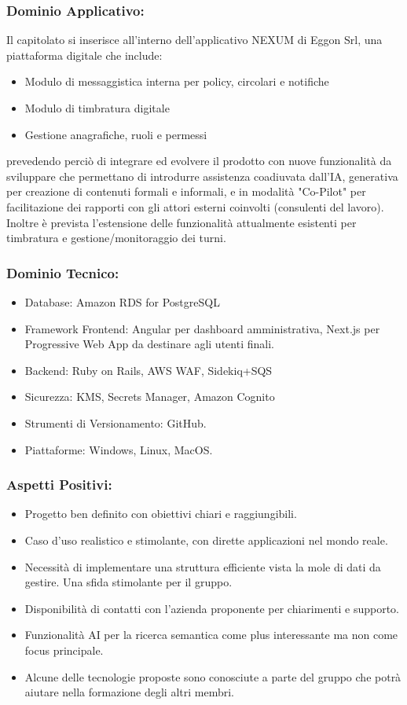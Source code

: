 \documentclass[a4paper,12pt]{article}
\begin{document}
\subsubsection*{Dominio Applicativo:}
Il capitolato si inserisce all'interno dell'applicativo NEXUM di Eggon Srl, una piattaforma digitale che include:
\begin{itemize}
    \item Modulo di messaggistica interna per policy, circolari e notifiche
    \item Modulo di timbratura digitale
    \item Gestione anagrafiche, ruoli e permessi
\end{itemize}
prevedendo perciò di integrare ed evolvere il prodotto con nuove funzionalità da sviluppare che permettano di introdurre assistenza coadiuvata dall'IA, generativa per creazione di contenuti formali e informali, e in modalità "Co-Pilot" per facilitazione dei rapporti con gli attori esterni coinvolti (consulenti del lavoro). Inoltre è prevista l'estensione delle funzionalità attualmente esistenti per timbratura e gestione/monitoraggio dei turni.
 
\subsubsection*{Dominio Tecnico:}
\begin{itemize}
    \item Database: Amazon RDS for PostgreSQL
    \item Framework Frontend: Angular per dashboard amministrativa, Next.js per Progressive Web App da destinare agli utenti finali.
    \item Backend: Ruby on Rails, AWS WAF, Sidekiq+SQS
    \item Sicurezza: KMS, Secrets Manager, Amazon Cognito
    \item Strumenti di Versionamento: GitHub.
    \item Piattaforme: Windows, Linux, MacOS.
\end{itemize}
\subsubsection*{Aspetti Positivi:}
\begin{itemize}
    \item Progetto ben definito con obiettivi chiari e raggiungibili.
    \item Caso d'uso realistico e stimolante, con dirette applicazioni nel mondo reale.
    \item Necessità di implementare una struttura efficiente vista la mole di dati da gestire. Una sfida stimolante per il gruppo.
    \item Disponibilità di contatti con l'azienda proponente per chiarimenti e supporto.
    \item Funzionalità AI per la ricerca semantica come plus interessante ma non come focus principale.
    \item Alcune delle tecnologie proposte sono conosciute a parte del gruppo che potrà aiutare nella formazione degli altri membri.
\end{itemize}
\end{document}
